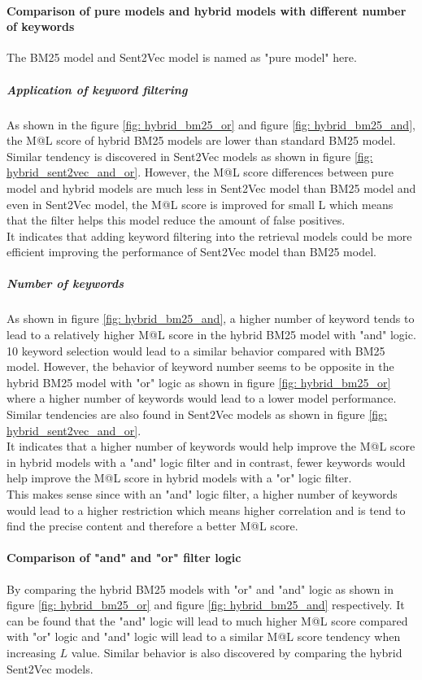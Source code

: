 \paragraph{Comparison of pure models and hybrid models with different number of keywords}
The BM25 model and Sent2Vec model is named as "pure model" here.


\subparagraph{Application of keyword filtering}
As shown in the figure \ref{fig: hybrid_bm25_or} and figure \ref{fig: hybrid_bm25_and}, the M@L score of hybrid BM25 models are lower than standard BM25 model.
Similar tendency is discovered in Sent2Vec models as shown in figure \ref{fig: hybrid_sent2vec_and_or}.
However, the M@L score differences between pure model and hybrid models are much less in Sent2Vec model than BM25 model and even in Sent2Vec model, the M@L score is improved for small L which means that the filter helps this model reduce the amount of false positives.\\

It indicates that adding keyword filtering into the retrieval models could be more efficient improving the performance of Sent2Vec model than BM25 model.

\subparagraph{Number of keywords}
As shown in figure \ref{fig: hybrid_bm25_and}, a higher number of keyword tends to lead to a relatively higher M@L score in the hybrid BM25 model with "and" logic. 10 keyword selection would lead to a similar behavior compared with BM25 model. However, the behavior of keyword number seems to be opposite in the hybrid BM25 model with "or" logic as shown in figure \ref{fig: hybrid_bm25_or}  where a higher number of keywords would lead to a lower model performance.
Similar tendencies are also found in Sent2Vec models as shown in figure \ref{fig: hybrid_sent2vec_and_or}.\\

It indicates that a higher number of keywords would help improve the M@L score in hybrid models with a "and" logic filter and in contrast, fewer keywords would help improve the M@L score in hybrid models with a "or" logic filter.\\			

This makes sense since with an "and" logic filter, a higher number of keywords would lead to a higher restriction which means higher correlation and is tend to find the precise content and therefore a better M@L score.

\paragraph{Comparison of "and" and "or" filter logic}
By comparing the hybrid BM25 models with "or" and "and" logic as shown in 
figure \ref{fig: hybrid_bm25_or} and figure \ref{fig: hybrid_bm25_and} respectively. It can be found that the "and" logic will lead to much higher M@L score compared with "or" logic and "and" logic will lead to a similar M@L score tendency when increasing $L$ value. Similar behavior is also discovered by comparing the hybrid Sent2Vec models.\\

